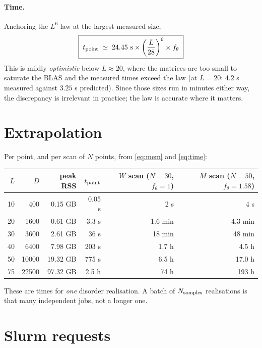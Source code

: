 \documentclass[11pt,a4paper]{article}
\begin{document}
\paragraph{Time.} Anchoring the $L^6$ law at the largest measured size,
\begin{equation}
  \boxed{\;t_{\rm point} \;\simeq\; 24.45\ \mathrm{s} \times \left(\frac{L}{28}\right)^{6}
  \times f_\theta\;}
  \label{eq:time}
\end{equation}
This is mildly \emph{optimistic} below $L\approx20$, where the matrices are too small to
saturate the BLAS and the measured times exceed the law (at $L=20$: $4.2$ s measured against
$3.25$ s predicted). Since those sizes run in minutes either way, the discrepancy is
irrelevant in practice; the law is accurate where it matters.

\section{Extrapolation}

Per point, and per scan of $N$ points, from \eqref{eq:mem} and \eqref{eq:time}:

\begin{center}
\begin{tabular}{@{}rrrrrr@{}}
\toprule
$L$ & $D$ & peak RSS & $t_{\rm point}$ & $W$ scan ($N=30$, $f_\theta=1$)
& $M$ scan ($N=50$, $f_\theta=1.58$) \\
\midrule
10 &   400 &  0.15 GB & 0.05 s & 2 s     & 4 s \\
20 &  1600 &  0.61 GB & 3.3 s  & 1.6 min & 4.3 min \\
30 &  3600 &  2.61 GB & 36 s   & 18 min  & 48 min \\
40 &  6400 &  7.98 GB & 203 s  & 1.7 h   & 4.5 h \\
50 & 10000 & 19.32 GB & 775 s  & 6.5 h   & 17.0 h \\
75 & 22500 & 97.32 GB & 2.5 h  & 74 h    & 193 h \\
\bottomrule
\end{tabular}
\end{center}

\noindent
These are times for \emph{one} disorder realisation. A batch of $N_{\rm samples}$ realisations
is that many independent jobs, not a longer one.

\section{Slurm requests}
\end{document}
